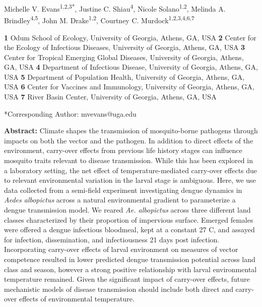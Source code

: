\documentclass[12pt]{article}
\begin{document}
\setlength\parindent{0pt}%

{\Large
\textbf{}}

\bigskip

Michelle V. Evans\textsuperscript{1,2,3*},
Justine C. Shiau\textsuperscript{4},
Nicole Solano\textsuperscript{1,2},
Melinda A. Brindley\textsuperscript{4,5},
John M. Drake\textsuperscript{1,2},
Courtney C. Murdock\textsuperscript{1,2,3,4,6,7}
\smallskip


\textbf{1} Odum School of Ecology, University of Georgia, Athens, GA, USA
\newline
\textbf{2} Center for the Ecology of Infectious Diseases, University of Georgia, Athens, GA, USA
\newline
\textbf{3} Center for Tropical Emerging Global Diseases, University of Georgia, Athens, GA, USA
\newline
\textbf{4} Department of Infectious Disease, University of Georgia, Athens, GA, USA
\newline
\textbf{5} Department of Population Health, University of Georgia, Athens, GA, USA
\newline
\textbf{6} Center for Vaccines and Immunology, University of Georgia, Athens, GA, USA
\newline
\textbf{7} River Basin Center, University of Georgia, Athens, GA, USA
\smallskip

\noindent
*Corresponding Author: mvevans@uga.edu
\bigskip

\newpage

\linenumbers

\doublespacing

\textbf{Abstract:} Climate shapes the transmission of mosquito-borne pathogens through impacts on both the vector and the pathogen.  In addition to direct effects of the environment, carry-over effects from previous life history stages can influence mosquito traits relevant to disease transmission. While this has been explored in a laboratory setting, the net effect of temperature-mediated carry-over effects due to relevant environmental variation in the larval stage is ambiguous. Here, we use data collected from a semi-field experiment investigating dengue dynamics in \textit{Aedes albopictus} across a natural environmental gradient to parameterize a dengue transmission model. We reared \textit{Ae. albopictus} across three different land classes characterized by their proportion of impervious surface. Emerged females were offered a dengue infectious bloodmeal, kept at a constant 27 \degree C, and assayed for infection, dissemination, and infectiousness 21 days post infection. Incorporating carry-over effects of larval environment on measures of vector competence resulted in lower predicted dengue transmission potential across land class and season, however a strong positive relationship with larval environmental temperature remained. Given the significant impact of carry-over effects, future mechanistic models of disease transmission should include both direct and carry-over effects of environmental temperature.
\end{document}
